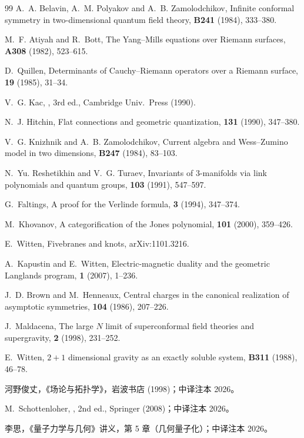 \begin{thebibliography}{99}
 A.~A. Belavin, A.~M. Polyakov and A.~B. Zamolodchikov,
\newblock Infinite conformal symmetry in two-dimensional quantum field theory,
 {\bf B241} (1984), 333--380.

 M.~F. Atiyah and R.~Bott,
\newblock The Yang--Mills equations over Riemann surfaces,
 {\bf A308} (1982), 523--615.

 D.~Quillen,
\newblock Determinants of Cauchy--Riemann operators over a Riemann surface,
 {\bf 19} (1985), 31--34.

 V.~G. Kac,
, 3rd ed.,
Cambridge Univ.\ Press (1990).

 N.~J. Hitchin,
\newblock Flat connections and geometric quantization,
 {\bf 131} (1990), 347--380.

 V.~G. Knizhnik and A.~B. Zamolodchikov,
\newblock Current algebra and Wess--Zumino model in two dimensions,
 {\bf B247} (1984), 83--103.

 N.~Yu. Reshetikhin and V.~G. Turaev,
\newblock Invariants of $3$-manifolds via link polynomials and quantum groups,
 {\bf 103} (1991), 547--597.

 G.~Faltings,
\newblock A proof for the Verlinde formula,
 {\bf 3} (1994), 347--374.

 M.~Khovanov,
\newblock A categorification of the Jones polynomial,
 {\bf 101} (2000), 359--426.

 E.~Witten,
\newblock Fivebranes and knots,
\newblock arXiv:1101.3216.

 A.~Kapustin and E.~Witten,
\newblock Electric-magnetic duality and the geometric Langlands program,
 {\bf 1} (2007), 1--236.

 J.~D. Brown and M.~Henneaux,
\newblock Central charges in the canonical realization of asymptotic symmetries,
 {\bf 104} (1986), 207--226.

 J.~Maldacena,
\newblock The large $N$ limit of superconformal field theories and supergravity,
 {\bf 2} (1998), 231--252.

 E.~Witten,
\newblock $2+1$ dimensional gravity as an exactly soluble system,
 {\bf B311} (1988), 46--78.

 河野俊丈，《场论与拓扑学》，岩波书店 (1998)；中译注本 2026。

 M.~Schottenloher,
, 2nd ed.,
Springer (2008)；中译注本 2026。

 李思，《量子力学与几何》讲义，第 5 章（几何量子化）；中译注本 2026。

\end{thebibliography}

